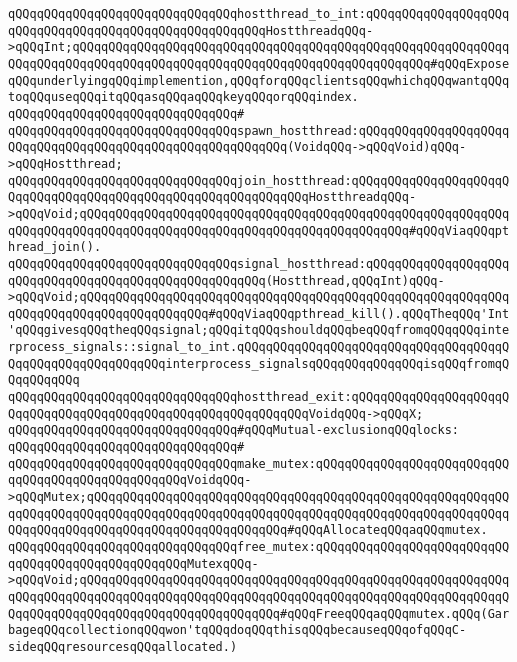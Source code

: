 \verb|qQQqqQQqqQQqqQQqqQQqqQQqqQQqqQQqhostthread_to_int:qQQqqQQqqQQqqQQqqQQqqQQqqQQqqQQqqQQqqQQqqQQqqQQqqQQqqQQqHostthreadqQQq->qQQqInt;qQQqqQQqqQQqqQQqqQQqqQQqqQQqqQQqqQQqqQQqqQQqqQQqqQQqqQQqqQQqqQQqqQQqqQQqqQQqqQQqqQQqqQQqqQQqqQQqqQQqqQQqqQQqqQQqqQQqqQQq#qQQqExposeqQQqunderlyingqQQqimplemention,qQQqforqQQqclientsqQQqwhichqQQqwantqQQqtoqQQquseqQQqitqQQqasqQQqaqQQqkeyqQQqorqQQqindex.|\newline
\verb|qQQqqQQqqQQqqQQqqQQqqQQqqQQqqQQq#|\newline
\verb|qQQqqQQqqQQqqQQqqQQqqQQqqQQqqQQqspawn_hostthread:qQQqqQQqqQQqqQQqqQQqqQQqqQQqqQQqqQQqqQQqqQQqqQQqqQQqqQQqqQQq(VoidqQQq->qQQqVoid)qQQq->qQQqHostthread;|\newline
\verb|qQQqqQQqqQQqqQQqqQQqqQQqqQQqqQQqjoin_hostthread:qQQqqQQqqQQqqQQqqQQqqQQqqQQqqQQqqQQqqQQqqQQqqQQqqQQqqQQqqQQqqQQqHostthreadqQQq->qQQqVoid;qQQqqQQqqQQqqQQqqQQqqQQqqQQqqQQqqQQqqQQqqQQqqQQqqQQqqQQqqQQqqQQqqQQqqQQqqQQqqQQqqQQqqQQqqQQqqQQqqQQqqQQqqQQqqQQqqQQq#qQQqViaqQQqpthread_join().|\newline
\verb|qQQqqQQqqQQqqQQqqQQqqQQqqQQqqQQqsignal_hostthread:qQQqqQQqqQQqqQQqqQQqqQQqqQQqqQQqqQQqqQQqqQQqqQQqqQQqqQQq(Hostthread,qQQqInt)qQQq->qQQqVoid;qQQqqQQqqQQqqQQqqQQqqQQqqQQqqQQqqQQqqQQqqQQqqQQqqQQqqQQqqQQqqQQqqQQqqQQqqQQqqQQqqQQqqQQq#qQQqViaqQQqpthread_kill().qQQqTheqQQq'Int'qQQqgivesqQQqtheqQQqsignal;qQQqitqQQqshouldqQQqbeqQQqfromqQQqqQQqinterprocess_signals::signal_to_int.qQQqqQQqqQQqqQQqqQQqqQQqqQQqqQQqqQQqqQQqqQQqqQQqqQQqqQQqqQQqinterprocess_signalsqQQqqQQqqQQqqQQqisqQQqfromqQQqqQQqqQQq|\newline
\verb|qQQqqQQqqQQqqQQqqQQqqQQqqQQqqQQqhostthread_exit:qQQqqQQqqQQqqQQqqQQqqQQqqQQqqQQqqQQqqQQqqQQqqQQqqQQqqQQqqQQqqQQqVoidqQQq->qQQqX;|\newline
\newline
\verb|qQQqqQQqqQQqqQQqqQQqqQQqqQQqqQQq#qQQqMutual-exclusionqQQqlocks:|\newline
\verb|qQQqqQQqqQQqqQQqqQQqqQQqqQQqqQQq#|\newline
\verb|qQQqqQQqqQQqqQQqqQQqqQQqqQQqqQQqmake_mutex:qQQqqQQqqQQqqQQqqQQqqQQqqQQqqQQqqQQqqQQqqQQqqQQqqQQqVoidqQQq->qQQqMutex;qQQqqQQqqQQqqQQqqQQqqQQqqQQqqQQqqQQqqQQqqQQqqQQqqQQqqQQqqQQqqQQqqQQqqQQqqQQqqQQqqQQqqQQqqQQqqQQqqQQqqQQqqQQqqQQqqQQqqQQqqQQqqQQqqQQqqQQqqQQqqQQqqQQqqQQqqQQqqQQqqQQqqQQq#qQQqAllocateqQQqaqQQqmutex.|\newline
\verb|qQQqqQQqqQQqqQQqqQQqqQQqqQQqqQQqfree_mutex:qQQqqQQqqQQqqQQqqQQqqQQqqQQqqQQqqQQqqQQqqQQqqQQqqQQqMutexqQQq->qQQqVoid;qQQqqQQqqQQqqQQqqQQqqQQqqQQqqQQqqQQqqQQqqQQqqQQqqQQqqQQqqQQqqQQqqQQqqQQqqQQqqQQqqQQqqQQqqQQqqQQqqQQqqQQqqQQqqQQqqQQqqQQqqQQqqQQqqQQqqQQqqQQqqQQqqQQqqQQqqQQqqQQqqQQqqQQq#qQQqFreeqQQqaqQQqmutex.qQQq(GarbageqQQqcollectionqQQqwon'tqQQqdoqQQqthisqQQqbecauseqQQqofqQQqC-sideqQQqresourcesqQQqallocated.)|\newline
